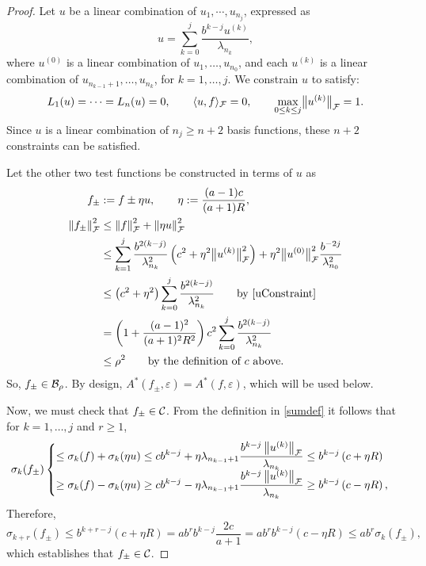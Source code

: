 \documentclass[graybox,footinfo]{svmult}
\newcommand{\DHJRnorm}[2][{}]{\ensuremath{\left \lVert #2 \right \rVert}_{#1}}
\newcommand{\DHJRbignorm}[2][{}]{\ensuremath{\bigl \lVert #2 \bigr \rVert}_{#1}}
\begin{document}
\begin{proof}
Let $u$ be a linear combination of $u_1, \cdots, u_{n_j}$, expressed as
\[
u =  \sum_{k=0}^{j}\frac{b^{k-j}u^{(k)}}{\lambda_{n_k}},
\]
where $u^{(0)}$ is a linear combination of $u_{1}, \ldots, u_{n_0}$, and each $u^{(k)}$ is a linear combination of $u_{n_{k-1}+1}, \ldots, u_{n_k}$, for $k =1, \ldots, j$.  We constrain $u$ to satisfy:
\begin{equation}\label{uConstraint}
L_1(u) = \cdots = L_n(u) = 0, \qquad \langle u,f \rangle_{\calF} = 0, \qquad 
\max_{0\le k\le j} \DHJRbignorm[\calF]{u^{(k)}} = 1.
\end{equation}
Since $u$ is a linear combination of $n_j  \ge n+2$ basis functions, these $n+2$ constraints can be satisfied.

Let the other two test functions be constructed in terms of $u$ as 
\begin{align}
\label{DHJRetaDef}
f_\pm & := f \pm \eta u, \qquad \eta : =  \frac {(a-1)c}{(a+1)R}, \\
\nonumber
\DHJRnorm[\calF]{f_\pm}^2 & \le \DHJRnorm[\calF]{f}^2 + \DHJRnorm[\calF]{\eta u }^2  \\
& \nonumber 
\le \sum_{k=1}^j \frac{ b^{2(k-j)}}{\lambda^2_{n_{k}}} \left(c^2+ \eta^2 \DHJRbignorm[\calF]{u^{(k)}}^2\right) + \eta^2 \DHJRbignorm[\calF]{u^{(0)}}^2 \frac{b^{-2j}}{\lambda_{n_0}^2}\\
\nonumber
& \le  \left(c^2+ \eta^2 \right) \sum_{k=0}^j \frac{ b^{2(k-j)}}{\lambda^2_{n_{k}}}  \qquad \text{by \eqref{uConstraint}}\\
& \nonumber = \left(1+\frac{(a-1)^2}{(a+1)^{2} R^2 }\right)c^2 \sum_{k=0}^j\frac{ b^{2(k-j)}}{\lambda^2_{n_{k}}} \\
& \nonumber 
\le \rho^2 \qquad \text{by the definition of $c$ above}.
\end{align} 
So, $f_{\pm} \in {\mathcal{B}}_{\rho}$.  By design, $A^*(f_\pm,\varepsilon) = A^*(f,\varepsilon)$, which will be used below.

Now, we must check that $f_\pm \in {\mathcal{C}}$. From the definition in \eqref{sumdef} it follows that for $k = 1, \ldots, j$ and $r \ge 1$,
\begin{equation*}
\sigma_k(f_\pm)  \begin{cases} 
\displaystyle
\le \sigma_k(f) + \sigma_k(\eta u)\le 
c b^{k-j} + \eta\lambda_{n_{k-1}+1}\frac{b^{k-j}\DHJRnorm[\calF]{u^{(k)} } }{\lambda_{n_k}}
\le b^{k-j}\left(c+\eta R \right) 
\\[1ex]
\displaystyle
\ge \sigma_k(f) - \sigma_k(\eta u)\ge 
c b^{k-j} - \eta\lambda_{n_{k-1}+1}\frac{b^{k-j}\DHJRnorm[\calF]{u^{(k)} } }{\lambda_{n_k}}
\ge b^{k-j}\left(c-\eta R \right) , 
\end{cases}
\end{equation*}
Therefore, 
\begin{equation*}
\sigma_{k+r}(f_\pm)
\le b^{k+r-j}(c+\eta R) = ab^r b^{k-j}\frac{2c}{a+1}
=ab^r b^{k-j}\left(c-\eta R \right) \le a b^r \sigma_{k}(f_\pm),
\end{equation*}
which establishes that $f_\pm \in {\mathcal{C}}$.


\end{proof}
\end{document}
